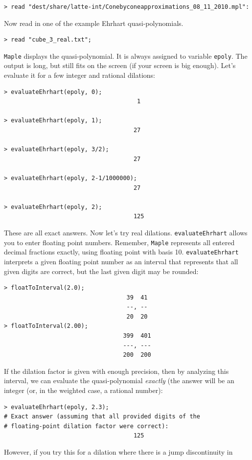 \documentclass{article}
\newcommand{\maple}{{\tt Maple}\xspace}
\begin{document}
\begin{verbatim}
> read "dest/share/latte-int/Conebyconeapproximations_08_11_2010.mpl":
\end{verbatim}
Now read in one of the example Ehrhart quasi-polynomials.
\begin{verbatim}
> read "cube_3_real.txt";
\end{verbatim}
\maple displays the quasi-polynomial.  It is always assigned to variable
\texttt{epoly}.  The output is long, but still fits on the screen
(if your screen is big enough).  Let's evaluate it for a few integer and
rational dilations:
\begin{verbatim}
> evaluateEhrhart(epoly, 0);
                                      1

> evaluateEhrhart(epoly, 1);
                                     27

> evaluateEhrhart(epoly, 3/2);
                                     27

> evaluateEhrhart(epoly, 2-1/1000000);
                                     27

> evaluateEhrhart(epoly, 2);          
                                     125
\end{verbatim}
These are all exact answers.
Now let's try real dilations.  \texttt{evaluateEhrhart} allows you to enter
floating point numbers.  Remember, \maple represents all entered decimal
fractions exactly, using floating point with basis 10.
\texttt{evaluateEhrhart} interprets a given floating point number as an
interval that represents that all given digits are correct, but the last given
digit may be rounded:
\begin{verbatim}
> floatToInterval(2.0);
                                   39  41
                                   --, --
                                   20  20
> floatToInterval(2.00);
                                  399  401
                                  ---, ---
                                  200  200
\end{verbatim}
If the dilation factor is given with enough precision, then by analyzing this
interval, we can evaluate the quasi-polynomial \emph{exactly} (the answer will
be an integer (or, in the weighted case, a rational number):
\begin{verbatim}
> evaluateEhrhart(epoly, 2.3);
# Exact answer (assuming that all provided digits of the 
# floating-point dilation factor were correct):
                                     125
\end{verbatim}
However, if you try this for a dilation where there is a jump discontinuity in
\end{document}
